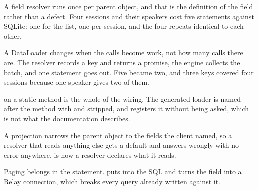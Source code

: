 \begin{chaptersummary}
  \item A field resolver runs once per parent object, and that is the
        definition of the field rather than a defect. Four sessions and their
        speakers cost five statements against SQLite: one for the list, one
        per session, and the four repeats identical to each other.
  \item A DataLoader changes when the calls become work, not how many calls
        there are. The resolver records a key and returns a promise, the
        engine collects the batch, and one statement goes out. Five became
        two, and three keys covered four sessions because one speaker gives
        two of them.
  \item \code{[DataLoader]} on a static method is the whole of the wiring. The
        generated loader is named after the method with  and
         stripped, and  registers it
        without being asked, which is not what the documentation describes.
  \item A projection narrows the parent object to the fields the client named,
        so a resolver that reads anything else gets a default and answers
        wrongly with no error anywhere.  is how a
        resolver declares what it reads.
  \item Paging belongs in the statement. \code{[UsePaging]} puts 
        into the SQL and turns the field into a Relay connection, which breaks
        every query already written against it.
\end{chaptersummary}
